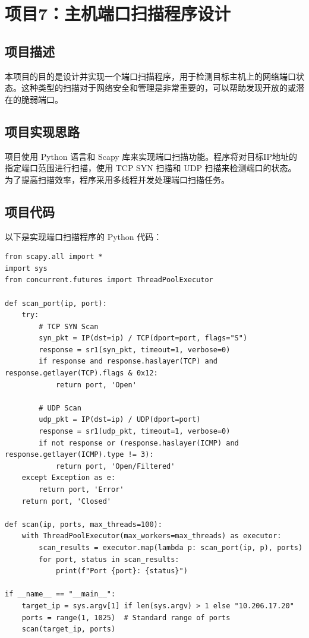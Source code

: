 \documentclass[UTF8,titlepage]{ctexart}
\numberwithin{figure}{section}
\begin{document}
\clearpage

\section{项目7：主机端口扫描程序设计}

\subsection{项目描述}
本项目的目的是设计并实现一个端口扫描程序，用于检测目标主机上的网络端口状态。这种类型的扫描对于网络安全和管理是非常重要的，可以帮助发现开放的或潜在的脆弱端口。

\subsection{项目实现思路}
项目使用 Python 语言和 Scapy 库来实现端口扫描功能。程序将对目标IP地址的指定端口范围进行扫描，使用 TCP SYN 扫描和 UDP 扫描来检测端口的状态。为了提高扫描效率，程序采用多线程并发处理端口扫描任务。

\subsection{项目代码}
以下是实现端口扫描程序的 Python 代码：

\begin{verbatim}
from scapy.all import *
import sys
from concurrent.futures import ThreadPoolExecutor

def scan_port(ip, port):
    try:
        # TCP SYN Scan
        syn_pkt = IP(dst=ip) / TCP(dport=port, flags="S")
        response = sr1(syn_pkt, timeout=1, verbose=0)
        if response and response.haslayer(TCP) and response.getlayer(TCP).flags & 0x12:
            return port, 'Open'

        # UDP Scan
        udp_pkt = IP(dst=ip) / UDP(dport=port)
        response = sr1(udp_pkt, timeout=1, verbose=0)
        if not response or (response.haslayer(ICMP) and response.getlayer(ICMP).type != 3):
            return port, 'Open/Filtered'
    except Exception as e:
        return port, 'Error'
    return port, 'Closed'

def scan(ip, ports, max_threads=100):
    with ThreadPoolExecutor(max_workers=max_threads) as executor:
        scan_results = executor.map(lambda p: scan_port(ip, p), ports)
        for port, status in scan_results:
            print(f"Port {port}: {status}")

if __name__ == "__main__":
    target_ip = sys.argv[1] if len(sys.argv) > 1 else "10.206.17.20"
    ports = range(1, 1025)  # Standard range of ports
    scan(target_ip, ports)
\end{verbatim}
\end{document}
